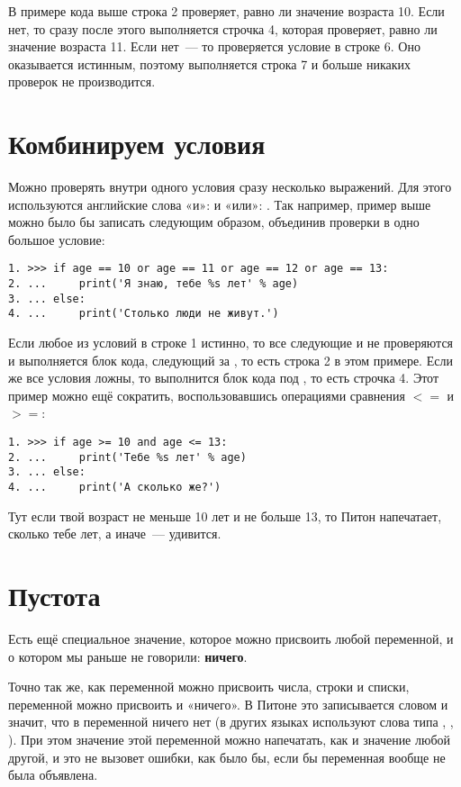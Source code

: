 В примере кода выше строка 2 проверяет, равно ли значение возраста 10. Если нет, то сразу после этого выполняется строчка 4, которая проверяет, равно ли значение возраста 11. Если нет — то проверяется условие в строке 6. Оно оказывается истинным, поэтому выполняется строка 7 и больше никаких проверок не производится.

\section{Комбинируем условия}
Можно проверять внутри одного условия сразу несколько выражений. Для этого используются английские слова «и»:  и «или»: . Так например, пример выше можно было бы записать следующим образом, объединив проверки в одно большое условие:

\begin{listing}
\begin{verbatim}
1. >>> if age == 10 or age == 11 or age == 12 or age == 13:
2. ...     print('Я знаю, тебе %s лет' % age)
3. ... else:
4. ...     print('Столько люди не живут.')
\end{verbatim}
\end{listing}

Если любое из условий в строке 1 истинно, то все следующие и не проверяются и выполняется блок кода, следующий за , то есть строка 2 в этом примере. Если же все условия ложны, то выполнится блок кода под , то есть строчка 4. Этот пример можно ещё сократить, воспользовавшись операциями сравнения $<=$ и $>=$:

\begin{listing}
\begin{verbatim}
1. >>> if age >= 10 and age <= 13:
2. ...     print('Тебе %s лет' % age)
3. ... else:
4. ...     print('А сколько же?')
\end{verbatim}
\end{listing}

Тут если твой возраст не меньше 10 лет и не больше 13, то Питон напечатает, сколько тебе лет, а иначе — удивится.

\section{Пустота}

Есть ещё специальное значение, которое можно присвоить любой переменной, и о котором мы раньше не говорили: \textbf{ничего}.

Точно так же, как переменной можно присвоить числа, строки и списки, переменной можно присвоить и «ничего». В Питоне это записывается словом  и значит, что в переменной ничего нет (в других языках используют слова типа , , ). При этом значение этой переменной можно напечатать, как и значение любой другой, и это не вызовет ошибки, как было бы, если бы переменная вообще не была объявлена.

